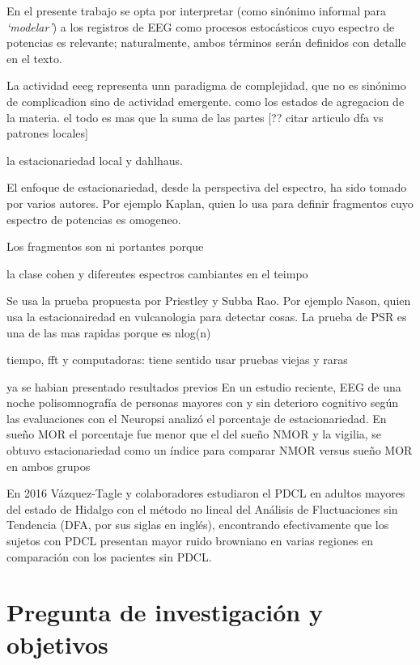 En el presente trabajo se opta por interpretar (como sinónimo informal para \textit{`modelar'}) a los registros de EEG como procesos estocásticos cuyo espectro de potencias es relevante; naturalmente, ambos términos serán definidos con detalle en el texto.

La actividad eeeg representa unn paradigma de complejidad, que no es sinónimo de complicadion sino de actividad emergente.
como los estados de agregacion de la materia.
el todo es mas que la suma de las partes
[?? citar articulo dfa vs patrones locales]

la estacionariedad local y dahlhaus.

El enfoque de estacionariedad, desde la perspectiva del espectro, ha sido tomado por varios autores. Por ejemplo Kaplan, quien lo usa para definir fragmentos cuyo espectro de potencias es omogeneo. 

Los fragmentos son ni portantes porque

la clase cohen y diferentes espectros cambiantes en el teimpo

Se usa la prueba propuesta por Priestley y Subba Rao.
Por ejemplo Nason, quien usa la estacionairedad en vulcanologia para detectar cosas. La prueba de PSR es una de las mas rapidas porque es nlog(n)

tiempo, fft y computadoras: tiene sentido usar pruebas viejas y raras

ya se habian presentado resultados previos
En un estudio reciente, EEG de una noche polisomnografía de personas mayores con y sin deterioro cognitivo según las evaluaciones con el Neuropsi analizó el porcentaje de estacionariedad.  En sueño MOR el porcentaje fue menor que el del sueño NMOR y la vigilia, se obtuvo estacionariedad  como un índice para comparar NMOR versus sueño MOR en ambos grupos %

En 2016 Vázquez-Tagle y colaboradores estudiaron el PDCL en adultos mayores del estado de Hidalgo con el método no lineal del Análisis de Fluctuaciones sin Tendencia (DFA, por sus siglas en inglés), encontrando efectivamente que los sujetos con PDCL presentan mayor ruido browniano en varias regiones en comparación con los pacientes sin PDCL\cite{VazquezTagle16}.


\section*{Pregunta de investigación y objetivos}

